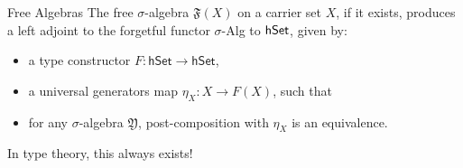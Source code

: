 \documentclass[9pt]{beamer}
\begin{document}
\begin{frame}{Free Algebras}
The free $\sigma$-algebra $\mathfrak{F}(X)$ on a carrier set $X$, \alert{if it exists}, produces a \alert{left adjoint} to the forgetful functor $\sigma$-Alg to $\mathsf{hSet}$, given by:
\begin{itemize}
    \item a type constructor $F : \mathsf{hSet} \to \mathsf{hSet}$,
    \item a universal generators map $\eta_X : X \to F(X)$, such that
    \item for any $\sigma$-algebra $\mathfrak{Y}$, post-composition with $\eta_X$ is an equivalence.
\end{itemize}

% 
% 
% 

In type theory, this always exists! 

\end{frame}
\end{document}
